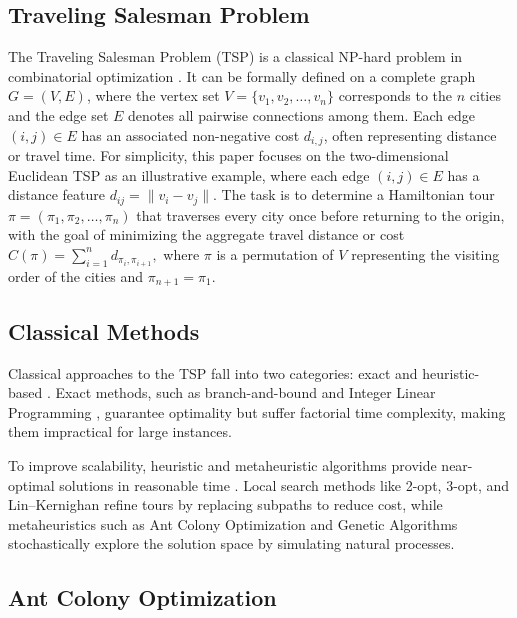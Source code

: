 \documentclass[a4paper,conference]{IEEEtran}
\begin{document}
\subsection{Traveling Salesman Problem}
The Traveling Salesman Problem (TSP) is a classical NP-hard problem in combinatorial optimization \cite{Applications}. It can be formally defined on a complete graph $G=(V,E)$, where the vertex set $V=\{v_1,v_2,\dots,v_n\}$ corresponds to the $n$ cities and the edge set $E$ denotes all pairwise connections among them. Each edge $(i,j)\in E$ has an associated non-negative cost $d_{i,j}$, often representing distance or travel time. For simplicity, this paper focuses on the two-dimensional Euclidean TSP as an illustrative example, where each edge $(i,j)\in E$ has a distance feature
$d_{ij} = \|v_i - v_j\|$.
The task is to determine a Hamiltonian tour $\pi = (\pi_1, \pi_2, \dots, \pi_n)$ that traverses every city once before returning to the origin, with the goal of minimizing the aggregate travel distance or cost
$
C(\pi) = \sum_{i=1}^n d_{\pi_i,\pi_{i+1}},
$
where $\pi$ is a permutation of $V$ representing the visiting order of the cities and $\pi_{n+1}=\pi_1$.

\subsection{Classical Methods}
Classical approaches to the TSP fall into two categories: exact and heuristic-based \cite{TSP2}. Exact methods, such as branch-and-bound \cite{branch} and Integer Linear Programming \cite{LP}, guarantee optimality but suffer factorial time complexity, making them impractical for large instances.

To improve scalability, heuristic and metaheuristic algorithms provide near-optimal solutions in reasonable time \cite{MetaHeuristic}. Local search methods like 2-opt, 3-opt, and Lin–Kernighan \cite{twoopt,LKH} refine tours by replacing subpaths to reduce cost, while metaheuristics such as Ant Colony Optimization \cite{ACO} and Genetic Algorithms \cite{GA} stochastically explore the solution space by simulating natural processes.

\subsection{Ant Colony Optimization}
\end{document}
